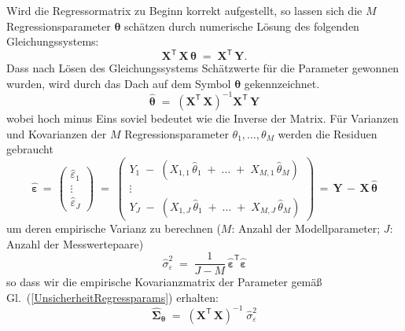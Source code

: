 Wird die Regressormatrix zu Beginn korrekt aufgestellt, so lassen sich die 
$M$ Regressionsparameter $\boldsymbol{\theta}$
schätzen durch numerische Lösung des folgenden Gleichungssystems:
\begin{equation}
\mathbf{X}^\mathsf{T} \, \mathbf{X} \, \boldsymbol{\theta} \; = \;
\mathbf{X}^\mathsf{T} \, \mathbf{Y} .
\label{LsgRegressionGlSys}
\end{equation}
Dass nach Lösen des Gleichungssystems Schätzwerte für
die Parameter gewonnen wurden, wird durch das Dach auf dem Symbol $\boldsymbol{\theta}$ gekennzeichnet.
\begin{equation}
 \boldsymbol{\hat \theta} \; = \;
\left( \mathbf{X}^\mathsf{T}  \, \mathbf{X} \right)^{-1} \mathbf{X}^\mathsf{T} \, \mathbf{Y}
\end{equation}
wobei hoch minus Eins soviel bedeutet wie die Inverse der Matrix.
Für Varianzen und Kovarianzen der $M$ Regressionsparameter $\theta_1, \dots, \theta_M$
werden die Residuen gebraucht
\begin{equation}
\boldsymbol{\hat \varepsilon} \, =  \, \left(
\begin{array}{c}
\hat \varepsilon_1\\
\vdots \\
\hat \varepsilon_J
\end{array}
\right)  \; = \;
\left(
\begin{array}{c}
 Y_{1} \; - \; (X_{1,1} \, \hat \theta_1  \; + \; \dots  \; + \;  X_{M,1} \, \hat \theta_{M})\\
\vdots \\
 Y_{J} \; - \; (X_{1,J} \, \hat \theta_1 \; + \; \dots  \; + \;  X_{M,J} \, \hat \theta_{M})
\end{array}
\right) \, = \, 
\mathbf{Y} \, -  \, \mathbf{X} \, \boldsymbol{\hat \theta}
\end{equation}
um deren empirische Varianz zu berechnen ($M$: Anzahl der Modellparameter; $J$: Anzahl der 
Messwertepaare)
\begin{equation}
\hat \sigma_{\varepsilon}^2 \; = \;
\frac{1}{J-M} \, \boldsymbol{\hat \varepsilon}^\mathsf{T} \boldsymbol{\hat \varepsilon}
\end{equation}
so dass wir die empirische Kovarianzmatrix der Parameter gemäß Gl.~(\ref{UnsicherheitRegressparams}) erhalten:
\begin{equation}
\boldsymbol{\hat \Sigma}_{\boldsymbol{\theta}} \; = \; 
\left( \mathbf{X}^\mathsf{T}  \, \mathbf{X} \right)^{-1} \;
\hat \sigma_{\varepsilon}^2
\label{eq:CovRegressparamsMatrix}
\end{equation}
